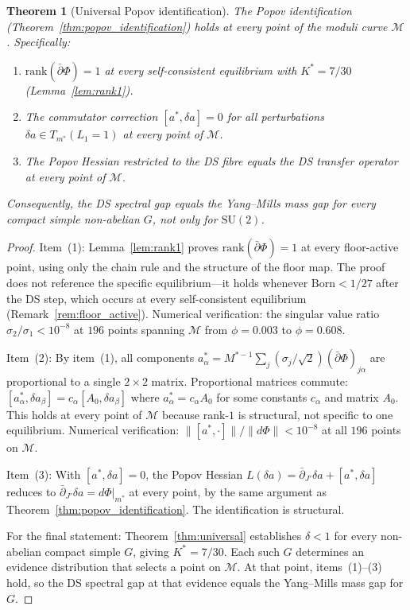 \documentclass[11pt,a4paper]{article}
\newtheorem{theorem}{Theorem}[section]
\theoremstyle{definition}
\theoremstyle{remark}
\newcommand{\dbar}{\bar{\partial}}
\newcommand{\SU}{\mathrm{SU}}
\begin{document}
\begin{theorem}[Universal Popov identification]\label{thm:popov_universal}
The Popov identification (Theorem~\ref{thm:popov_identification}) holds at every point of the moduli curve $\mathcal{M}$. Specifically:
\begin{enumerate}[nosep]
\item $\mathrm{rank}(\dbar\Phi)=1$ at every self-consistent equilibrium with $K^*=7/30$ (Lemma~\ref{lem:rank1}).
\item The commutator correction $[a^*,\delta a]=0$ for all perturbations $\delta a\in T_{m^*}(L_1=1)$ at every point of $\mathcal{M}$.
\item The Popov Hessian restricted to the DS fibre equals the DS transfer operator at every point of $\mathcal{M}$.
\end{enumerate}
Consequently, the DS spectral gap equals the Yang--Mills mass gap for every compact simple non-abelian $G$, not only for $\SU(2)$.
\end{theorem}

\begin{proof}
Item~(1): Lemma~\ref{lem:rank1} proves $\mathrm{rank}(\dbar\Phi)=1$ at every floor-active point, using only the chain rule and the structure of the floor map. The proof does not reference the specific equilibrium---it holds whenever $\mathrm{Born}<1/27$ after the DS step, which occurs at every self-consistent equilibrium (Remark~\ref{rem:floor_active}). Numerical verification: the singular value ratio $\sigma_2/\sigma_1<10^{-8}$ at $196$ points spanning $\mathcal{M}$ from $\phi=0.003$ to $\phi=0.608$.

Item~(2): By item~(1), all components $a^*_\alpha=M^{*-1}\sum_j(\sigma_j/\sqrt{2})(\dbar\Phi)_{j\alpha}$ are proportional to a single $2\times 2$ matrix. Proportional matrices commute: $[a^*_\alpha,\delta a_\beta]=c_\alpha[A_0,\delta a_\beta]$ where $a^*_\alpha=c_\alpha A_0$ for some constants $c_\alpha$ and matrix $A_0$. This holds at every point of $\mathcal{M}$ because rank-$1$ is structural, not specific to one equilibrium. Numerical verification: $\|[a^*,\cdot]\|/\|d\Phi\|<10^{-8}$ at all $196$ points on $\mathcal{M}$.

Item~(3): With $[a^*,\delta a]=0$, the Popov Hessian $L(\delta a)=\dbar_{J'}\delta a+[a^*,\delta a]$ reduces to $\dbar_{J'}\delta a=d\Phi|_{m^*}$ at every point, by the same argument as Theorem~\ref{thm:popov_identification}. The identification is structural.

For the final statement: Theorem~\ref{thm:universal} establishes $\delta<1$ for every non-abelian compact simple $G$, giving $K^*=7/30$. Each such $G$ determines an evidence distribution that selects a point on $\mathcal{M}$. At that point, items~(1)--(3) hold, so the DS spectral gap at that evidence equals the Yang--Mills mass gap for $G$.
\end{proof}
\end{document}
